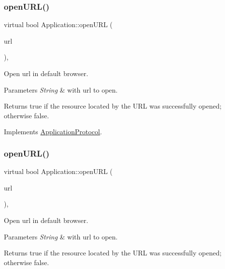 \subsubsection{\texorpdfstring{open\+U\+R\+L()}{openURL()}\hspace{0.1cm}{\footnotesize\ttfamily [9/12]}}
{\footnotesize\ttfamily virtual bool Application\+::open\+U\+RL (\begin{DoxyParamCaption}\item[{const std\+::string \&}]{url }\end{DoxyParamCaption})\hspace{0.3cm}{\ttfamily [override]}, {\ttfamily [virtual]}}



Open url in default browser. 


\begin{DoxyParams}{Parameters}
{\em String} & with url to open. \\
\hline
\end{DoxyParams}
\begin{DoxyReturn}{Returns}
true if the resource located by the U\+RL was successfully opened; otherwise false. 
\end{DoxyReturn}


Implements \hyperlink{classApplicationProtocol_a152a977b301a90253ec5a6533b2e8e04}{Application\+Protocol}.

\mbox{\label{classApplication_a13ccf5ab932de8a22255b56d085bed59}} 
\subsubsection{\texorpdfstring{open\+U\+R\+L()}{openURL()}\hspace{0.1cm}{\footnotesize\ttfamily [10/12]}}
{\footnotesize\ttfamily virtual bool Application\+::open\+U\+RL (\begin{DoxyParamCaption}\item[{const std\+::string \&}]{url }\end{DoxyParamCaption})\hspace{0.3cm}{\ttfamily [override]}, {\ttfamily [virtual]}}



Open url in default browser. 


\begin{DoxyParams}{Parameters}
{\em String} & with url to open. \\
\hline
\end{DoxyParams}
\begin{DoxyReturn}{Returns}
true if the resource located by the U\+RL was successfully opened; otherwise false. 
\end{DoxyReturn}


